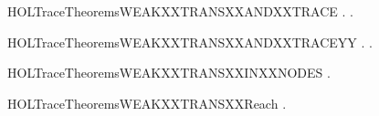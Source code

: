 \begin{SaveVerbatim}{HOLTraceTheoremsWEAKXXTRANSXXANDXXTRACE}
\HOLTokenTurnstile{} \HOLSymConst{\HOLTokenForall{}}  .
        \HOLTokenWeakTransBegin{}\HOLTokenWeakTransEnd {} \HOLSymConst{\HOLTokenEquiv{}}
       \HOLSymConst{\HOLTokenExists{}}.
               \HOLSymConst{\HOLTokenConj{}} \HOLSymConst{\HOLTokenNeg{}}  \HOLSymConst{\HOLTokenConj{}}
             \HOLSymConst{=} \HOLConst{\ensuremath{\tau}}       
\end{SaveVerbatim}
\newcommand{\HOLTraceTheoremsWEAKXXTRANSXXANDXXTRACE}{\UseVerbatim{HOLTraceTheoremsWEAKXXTRANSXXANDXXTRACE}}
\begin{SaveVerbatim}{HOLTraceTheoremsWEAKXXTRANSXXANDXXTRACEYY}
\HOLTokenTurnstile{} \HOLSymConst{\HOLTokenForall{}}  .
        \HOLTokenWeakTransBegin{}\HOLTokenWeakTransEnd {} \HOLSymConst{\HOLTokenEquiv{}}
       \HOLSymConst{\HOLTokenExists{}}.
               \HOLSymConst{\HOLTokenConj{}} \HOLSymConst{\HOLTokenNeg{}}  \HOLSymConst{\HOLTokenConj{}}
             \HOLSymConst{=} \HOLConst{\ensuremath{\tau}}       
\end{SaveVerbatim}
\newcommand{\HOLTraceTheoremsWEAKXXTRANSXXANDXXTRACEYY}{\UseVerbatim{HOLTraceTheoremsWEAKXXTRANSXXANDXXTRACEYY}}
\begin{SaveVerbatim}{HOLTraceTheoremsWEAKXXTRANSXXINXXNODES}
\HOLTokenTurnstile{} \HOLSymConst{\HOLTokenForall{}}  .  \HOLTokenWeakTransBegin{}\HOLTokenWeakTransEnd {} \HOLSymConst{\HOLTokenImp{}}  \HOLConst{\HOLTokenIn{}}  
\end{SaveVerbatim}
\newcommand{\HOLTraceTheoremsWEAKXXTRANSXXINXXNODES}{\UseVerbatim{HOLTraceTheoremsWEAKXXTRANSXXINXXNODES}}
\begin{SaveVerbatim}{HOLTraceTheoremsWEAKXXTRANSXXReach}
\HOLTokenTurnstile{} \HOLSymConst{\HOLTokenForall{}}  .  \HOLTokenWeakTransBegin{}\HOLTokenWeakTransEnd {} \HOLSymConst{\HOLTokenImp{}}   
\end{SaveVerbatim}
